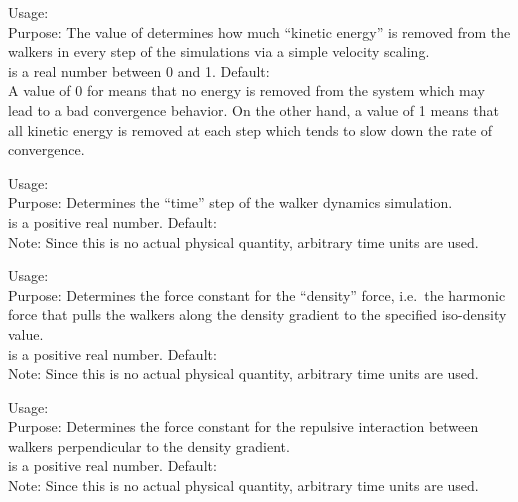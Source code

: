 {
  \noindent
  Usage:   \\[1.0ex] 
  Purpose: The value of  determines how much 
    ``kinetic energy'' is removed from the walkers in 
    every step of the simulations via a simple  
    velocity scaling. \\[1.0ex]
   is a real number between 0 and 1. 
    Default:  \\
}
A value of 0 for  means that no energy is 
removed from the system which may lead to a bad convergence 
behavior. On the other hand, a value of 1 means that all 
kinetic energy is removed at each step which tends to 
slow down the rate of convergence. 

{
  \noindent
  Usage:   \\[1.0ex] 
  Purpose: Determines the ``time'' step of the 
    walker dynamics simulation. \\[1.0ex]
   is a positive real number. Default:  \\
}
Note: Since this is no actual physical quantity, arbitrary 
time units are used. 

{
  \noindent
  Usage:   \\[1.0ex] 
  Purpose: Determines the force constant  
    for the ``density'' force, i.e.~the harmonic force 
    that pulls the walkers along the density gradient 
    to the specified iso-density value. \\[1.0ex]
   is a positive real number. Default:  \\
}
Note: Since this is no actual physical quantity, arbitrary 
time units are used. 

{
  \noindent
  Usage:   \\[1.0ex] 
  Purpose: Determines the force constant  
    for the repulsive interaction between walkers 
    perpendicular to the density gradient. \\[1.0ex]
   is a positive real number. Default:  \\
}
Note: Since this is no actual physical quantity, arbitrary 
time units are used. 

